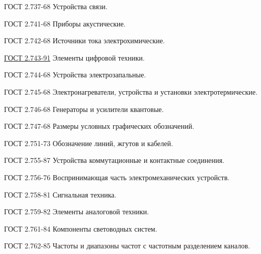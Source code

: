 ГОСТ 2.737-68 Устройства связи.

ГОСТ 2.741-68 Приборы акустические.

ГОСТ 2.742-68 Источники тока электрохимические.

\href{http://www.bmstu.ru/~rl1/courses/inform/gost2\_743-91.pdf}{ГОСТ
2.743-91} Элементы цифровой техники.

ГОСТ 2.744-68 Устройства электрозапальные.

ГОСТ 2.745-68 Электронагреватели, устройства и установки электротермические.

ГОСТ 2.746-68 Генераторы и усилители квантовые.

ГОСТ 2.747-68 Размеры условных графических обозначений.

ГОСТ 2.751-73 Обозначение линий, жгутов и кабелей.

ГОСТ 2.755-87 Устройства коммутационные и контактные соединения.

ГОСТ 2.756-76 Воспринимающая часть электромеханических устройств.

ГОСТ 2.758-81 Сигнальная техника.

ГОСТ 2.759-82 Элементы аналоговой техники.

ГОСТ 2.761-84 Компоненты световодных систем.

ГОСТ 2.762-85 Частоты и диапазоны частот с частотным разделением каналов.


